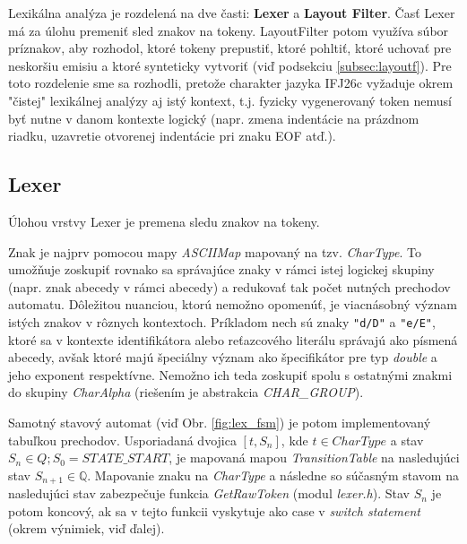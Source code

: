 \documentclass[11pt,a4paper]{article}
\begin{document}
  Lexikálna analýza je rozdelená na dve časti: \textbf{Lexer} a
  \textbf{Layout Filter}. Časť Lexer má za úlohu premeniť sled znakov na tokeny.
  LayoutFilter potom využíva súbor príznakov, aby rozhodol, ktoré tokeny
  prepustiť, ktoré pohltiť, ktoré uchovať pre neskoršiu emisiu a ktoré
  synteticky vytvoriť (viď podsekciu \ref{subsec:layoutf}). 
  Pre toto rozdelenie sme sa rozhodli, pretože charakter
  jazyka IFJ26c vyžaduje okrem "čistej" lexikálnej analýzy aj istý kontext,
  t.j. fyzicky vygenerovaný token nemusí byť nutne v danom kontexte logický
  (napr. zmena indentácie na prázdnom riadku, uzavretie otvorenej indentácie
  pri znaku EOF atď.).

  \subsection{Lexer}
  \label{subsec:lexer}
  Úlohou vrstvy Lexer je premena sledu znakov na tokeny.

  Znak je najprv pomocou mapy \textit{ASCIIMap} mapovaný na tzv.
  \textit{CharType}. 
  To umožňuje zoskupiť rovnako sa
  správajúce znaky v rámci istej logickej skupiny (napr. znak abecedy v rámci
  abecedy) a redukovať tak počet nutných prechodov automatu. Dôležitou
  nuanciou, ktorú nemožno opomenúť, je viacnásobný význam istých znakov v
  rôznych kontextoch. Príkladom nech sú znaky \verb+"d/D"+ a \verb+"e/E"+, ktoré sa v
  kontexte identifikátora alebo reťazcového literálu správajú ako písmená
  abecedy, avšak ktoré majú špeciálny význam ako špecifikátor pre typ
  \textit{double} a
  jeho exponent respektívne. Nemožno ich teda zoskupiť spolu s ostatnými znakmi do
  skupiny \textit{CharAlpha} (riešením je abstrakcia \textit{CHAR\_GROUP}).

  Samotný stavový automat (viď Obr. \ref{fig:lex_fsm}) je potom implementovaný tabuľkou prechodov.
  Usporiadaná dvojica $[t, S_n]$, kde $t \in CharType$ a stav
  $S_n \in Q; S_0 = STATE\_START$, je mapovaná mapou
  \textit{TransitionTable} na nasledujúci stav
  $S_{n+1} \in \mathbb{Q}$. Mapovanie znaku na \textit{CharType} a následne so súčasným
  stavom na nasledujúci stav
  zabezpečuje funkcia \textit{GetRawToken} (modul \textit{lexer.h}). Stav $S_{n}$ je potom koncový, ak
  sa v tejto funkcii vyskytuje ako case v \textit{switch
  statement} (okrem výnimiek, viď ďalej).
\end{document}
